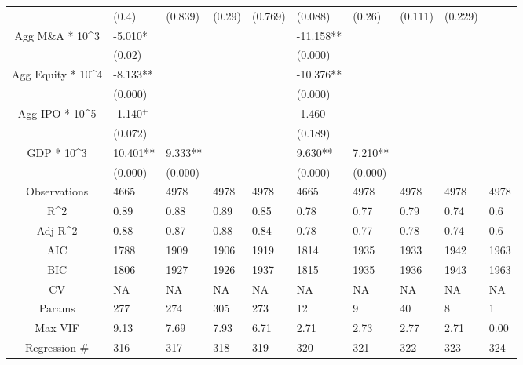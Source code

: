 \documentclass{article}
\begin{document}
\begin{table}[H]
\begin{tabular}{|clllllllll|}
   & (0.4) & (0.839) & (0.29) & (0.769) & (0.088) & (0.26) & (0.111) & (0.229) &  \\ 
  Agg M\&A * 10^3 & -5.010* &  &  &  & -11.158** &  &  &  &  \\ 
   & (0.02) &  &  &  & (0.000) &  &  &  &  \\ 
  Agg Equity * 10^4 & -8.133** &  &  &  & -10.376** &  &  &  &  \\ 
   & (0.000) &  &  &  & (0.000) &  &  &  &  \\ 
  Agg IPO * 10^5 & -1.140$^{+}$ &  &  &  & -1.460 &  &  &  &  \\ 
   & (0.072) &  &  &  & (0.189) &  &  &  &  \\ 
  GDP * 10^3 & 10.401** & 9.333** &  &  & 9.630** & 7.210** &  &  &  \\ 
   & (0.000) & (0.000) &  &  & (0.000) & (0.000) &  &  &  \\ 
  \hline 
 Observations & 4665 & 4978 & 4978 & 4978 & 4665 & 4978 & 4978 & 4978 & 4978 \\ 
  R^2 & 0.89 & 0.88 & 0.89 & 0.85 & 0.78 & 0.77 & 0.79 & 0.74 & 0.6 \\ 
  Adj R^2 & 0.88 & 0.87 & 0.88 & 0.84 & 0.78 & 0.77 & 0.78 & 0.74 & 0.6 \\ 
  AIC & 1788 & 1909 & 1906 & 1919 & 1814 & 1935 & 1933 & 1942 & 1963 \\ 
  BIC & 1806 & 1927 & 1926 & 1937 & 1815 & 1935 & 1936 & 1943 & 1963 \\ 
  CV & NA & NA & NA & NA & NA & NA & NA & NA & NA \\ 
  Params & 277 & 274 & 305 & 273 & 12 & 9 & 40 & 8 & 1 \\ 
  Max VIF & 9.13 & 7.69 & 7.93 & 6.71 & 2.71 & 2.73 & 2.77 & 2.71 & 0.00 \\ 
  Regression \# & 316 & 317 & 318 & 319 & 320 & 321 & 322 & 323 & 324 \\ 
   \hline
\end{tabular}
 
\end{table}
\end{document}
